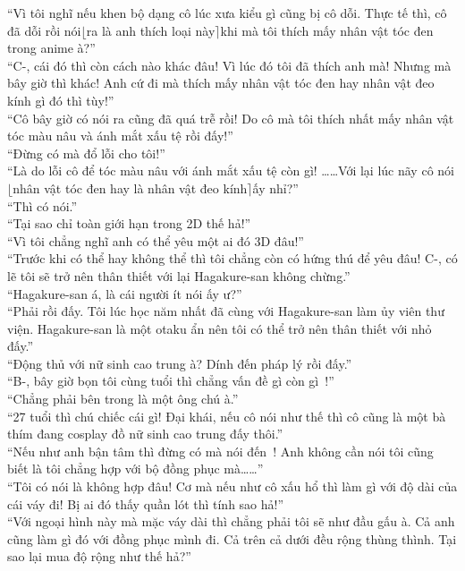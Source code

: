 \documentclass[12pt,a4paper, twosides]{book}
\begin{document}
“Vì tôi nghĩ nếu khen bộ dạng cô lúc xưa kiểu gì cũng bị cô dỗi. Thực tế thì, cô đã dỗi rồi nói$\lfloor$ra là anh thích loại này$\rceil$khi mà tôi thích mấy nhân vật tóc đen trong anime à?”\\
“C-, cái đó thì còn cách nào khác đâu! Vì lúc đó tôi đã thích anh mà! Nhưng mà bây giờ thì khác! Anh cứ đi mà thích mấy nhân vật tóc đen hay nhân vật đeo kính gì đó thì tùy!”\\
“Cô bây giờ có nói ra cũng đã quá trễ rồi! Do cô mà tôi thích nhất mấy nhân vật tóc màu nâu và ánh mắt xấu tệ rồi đấy!”\\
“Đừng có mà đổ lỗi cho tôi!”\\
“Là do lỗi cô để tóc màu nâu với ánh mắt xấu tệ còn gì! ……Với lại lúc nãy cô nói$\lfloor$nhân vật tóc đen hay là nhân vật đeo kính$\rceil$ấy nhỉ?”\\
“Thì có nói.”\\
“Tại sao chỉ toàn giới hạn trong 2D thế hả!”\\
“Vì tôi chẳng nghĩ anh có thể yêu một ai đó 3D đâu!”\\
“Trước khi có thể hay không thể thì tôi chẳng còn có hứng thú để yêu đâu! C-, có lẽ tôi sẽ trở nên thân thiết với lại Hagakure-san không chừng.”\\
“Hagakure-san á, là cái người ít nói ấy ư?”\\
“Phải rồi đấy. Tôi lúc học năm nhất đã cùng với Hagakure-san làm ủy viên thư viện. Hagakure-san là một otaku ẩn nên tôi có thể trở nên thân thiết với nhỏ đấy.”\\
“Động thủ với nữ sinh cao trung à? Dính đến pháp lý rồi đấy.”\\
“B-, bây giờ bọn tôi cùng tuổi thì chẳng vấn đề gì còn gì~!”\\
“Chẳng phải bên trong là một ông chú à.”\\
“27 tuổi thì chú chiếc cái gì! Đại khái, nếu cô nói như thế thì cô cũng là một bà thím đang cosplay đồ nữ sinh cao trung đấy thôi.”\\
“Nếu như anh bận tâm thì đừng có mà nói đến~! Anh không cần nói tôi cũng biết là tôi chẳng hợp với bộ đồng phục mà……”\\
“Tôi có nói là không hợp đâu! Cơ mà nếu như cô xấu hổ thì làm gì với độ dài của cái váy đi! Bị ai đó thấy quần lót thì tính sao hả!”\\
“Với ngoại hình này mà mặc váy dài thì chẳng phải tôi sẽ như đầu gấu à. Cả anh cũng làm gì đó với đồng phục mình đi. Cả trên cả dưới đều rộng thùng thình. Tại sao lại mua độ rộng như thế hả?”\\
\end{document}
